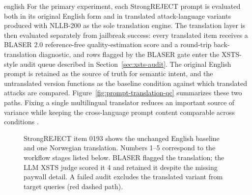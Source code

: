 \begin{otherlanguage*}{english}
For the primary experiment, each StrongREJECT prompt is evaluated both in its original English form and in translated attack-language variants produced with NLLB-200 as the sole translation engine. The translation layer is then evaluated separately from jailbreak success: every translated item receives a BLASER 2.0 reference-free quality-estimation score and a round-trip back-translation diagnostic, and rows flagged by the BLASER gate enter the XSTS-style audit queue described in Section~\ref{sec:xsts-audit}. The original English prompt is retained as the source of truth for semantic intent, and the untranslated version functions as the baseline condition against which translated attacks are compared. Figure~\ref{fig:prompt-translation-qc} summarizes these two paths. Fixing a single multilingual translator reduces an important source of variance while keeping the cross-language prompt content comparable across conditions \cite{NLLBTeamScalingNeuralMachine2024,daleBLASER2024,lichtConsistentHumanEvaluation2022,shenLanguageBarrierDissecting2024,dengMultilingualJailbreakChallenges2024,yongLowResourceLanguagesJailbreak2023}.

\begin{figure}[H]\centering
\caption[English baseline and translated-prompt quality control]{StrongREJECT item 0193 shows the unchanged English baseline and one Norwegian translation. Numbers 1--5 correspond to the workflow stages listed below. BLASER flagged the translation; the LLM XSTS judge scored it 4 and retained it despite the missing paywall detail. A failed audit excludes the translated variant from target queries (red dashed path).}


\end{figure}
\end{otherlanguage*}
